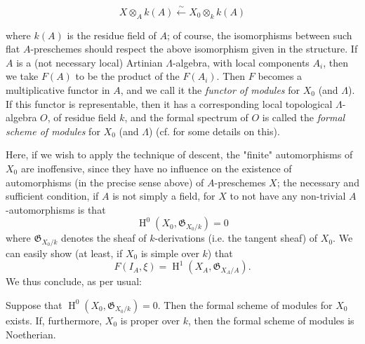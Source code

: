 \begin{equation}\tag{*}\label{fga3.ii-c.4-equation-star}
    X\otimes_A k(A) \xleftarrow{\sim} X_0\otimes_k k(A)
\end{equation}

where $k(A)$ is the residue field of $A$;
of course, the isomorphisms between such flat $A$-preschemes should respect the above isomorphism given in the structure.
If $A$ is a (not necessary local) Artinian $\Lambda$-algebra, with local components $A_i$, then we take $F(A)$ to be the product of the $F(A_i)$.
Then $F$ becomes a multiplicative functor in $A$, and we call it the \emph{functor of modules} for $X_0$ (and $\Lambda$).
If this functor is representable, then it has a corresponding local topological $\Lambda$-algebra $O$, of residue field $k$, and the formal spectrum of $O$ is called the \emph{formal scheme of modules} for $X_0$ (and $\Lambda$) (cf.  for some details on this).


Here, if we wish to apply the technique of descent, the "finite" automorphisms of $X_0$ are inoffensive, since they have no influence on the existence of automorphisms (in the precise sense above) of $A$-preschemes $X$;
the necessary and sufficient condition, if $A$ is not simply a field, for $X$ to not have any non-trivial $A$-automorphisms is that
\[
    \operatorname{H}^0(X_0,\mathfrak{G}_{X_0/k})
    = 0
\]
where $\mathfrak{G}_{X_0/k}$ denotes the sheaf of $k$-derivations (i.e. the tangent sheaf) of $X_0$.
We can easily show (at least, if $X_0$ is simple over $k$) that
\[
    F(I_A,\xi)
    = \operatorname{H}^1(X_A,\mathfrak{G}_{X_A/A}).
\]
We thus conclude, as per usual:

\begin{proposition}\label{fga3.ii-c.4-proposition-4.1}
    Suppose that $\operatorname{H}^0(X_0,\mathfrak{G}_{X_0/k})=0$.
    Then the formal scheme of modules for $X_0$ exists.
    If, furthermore, $X_0$ is proper over $k$, then the formal scheme of modules is Noetherian.
\end{proposition}


